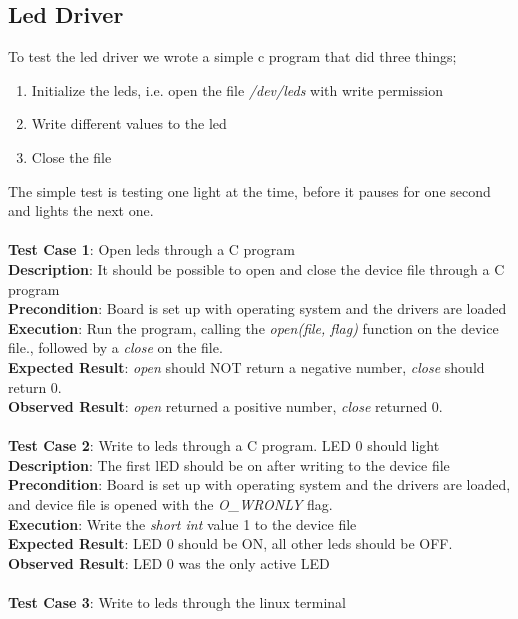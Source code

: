 \subsection{Led Driver}
To test the led driver we wrote a simple c program that did three things;
\begin{enumerate}
  \item Initialize the leds, i.e. open the file \textit{/dev/leds} with write permission
  \item Write different values to the led
  \item Close the file
\end{enumerate}
The simple test is testing one light at the time, before it pauses for one second and
lights the next one.\\
\\
{\bf Test Case 1}: Open leds through a C program \\
{\bf Description}: It should be possible to open and close the device file through a
C program \\
{\bf Precondition}: Board is set up with operating system and the drivers are loaded\\
{\bf Execution}: Run the program, calling the {\it open(file, flag)} function on the device
file., followed by a {\it close} on the file.\\
{\bf Expected Result}: {\it open} should NOT return a negative number, {\it close}
should return 0.\\
{\bf Observed Result}: {\it open} returned a positive number, {\it close}
returned 0. \\
 \\
{\bf Test Case 2}: Write to leds through a C program. LED 0 should light \\
{\bf Description}: The first lED should be on after writing to the device file \\
{\bf Precondition}: Board is set up with operating system and the drivers are loaded,
and device file is opened with the {\it O\_WRONLY} flag.\\
{\bf Execution}: Write the {\it short int} value 1 to the device file \\
{\bf Expected Result}: LED 0 should be ON, all other leds should be OFF. \\
{\bf Observed Result}: LED 0 was the only active LED \\
 \\
{\bf Test Case 3}: Write to leds through the linux terminal\\
